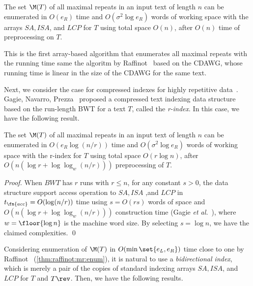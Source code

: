 \begin{corollary}\label{cor:fst:enum:arrays}
The set $\M(T)$ of all maximal repeats in an input text of length $n$ can be enumerated in $O(e_R)$ time and $O(\sigma^2\log e_R)$ words of working space with the arrays $SA, ISA$, and $LCP$ for $T$ using total space $O(n)$, after $O(n)$ time of preprocessing on $T$. 
\end{corollary}

This is the first array-based algorithm that enumerates all maximal repeats with the running time same the algoritm by Raffinot~\cite{raffinot2001maximal} based on the CDAWG, whose running time is linear in the size of the CDAWG for the same text. 

Next, we consider the case for compressed indexes for highly repetitive data~\cite{navarro2021indexing:ii}. 
Gagie, Navarro, Prezza~\cite{GagieNP20:RLBWT} proposed a compressed text indexing data structure based on the run-length BWT for a text $T$, called the \textit{r-index}. In this case, we have the following result. 

\begin{corollary}\label{cor:fst:enum:arrays}
The set $\M(T)$ of all maximal repeats in an input text of length $n$ can be enumerated in $O(e_R \log(n/r))$ time and $O(\sigma^2\log e_R)$ words of working space with the r-index\cite{GagieNP20:RLBWT} for $T$ using total space $O(r\log n)$, after $O(n(\log r + \log\log_w(n/r)))$ preprocessing of $T$. 
\end{corollary}

\begin{proof}
When $BWT$ has $r$ runs with $r \le n$, for any constant $s > 0$, the data structure support access operation to $SA, ISA$ ,and $LCP$ in  $t_\fn{acc} = O(\log(n/r))$ time using $s = O(rs)$ words of space and $O(n(\log r + \log\log_w(n/r)))$ construction time (Gagie \textit{et al.}~\cite[Appendix]{GagieNP20:RLBWT}), where $w = \floor{\log n}$ is the machine word size.  By selecting $s = \log n$, we have the claimed complexities. 
\qed 
\end{proof}

Considering enumeration of $\M(T)$ in $O(\min\set{e_L, e_R})$ time close to one by Raffinot~\cite{raffinot2001maximal} (\cref{thm:raffinot:mr:enum}), it is natural to use a \textit{bidirectional index}, which is merely a pair of the copies of standard indexing arrays $SA, ISA$, and $LCP$ for $T$ and $T\rev$. Then, we have the following results. 


